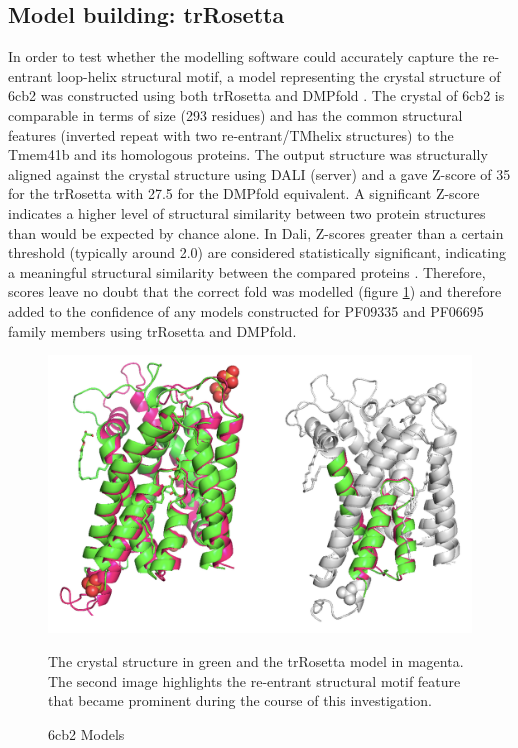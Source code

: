 \subsection{Model building: trRosetta}
In order to test whether the modelling software could accurately capture the re-entrant loop-helix structural motif, a model representing the crystal structure of 6cb2 was constructed using both trRosetta and DMPfold \cite{Greener2019}. The crystal of 6cb2 is comparable in terms of size (293 residues) and has the common structural features (inverted repeat with two re-entrant/TMhelix structures) to the Tmem41b and its homologous proteins.  The output structure was structurally aligned against the crystal structure using DALI (server) and a gave Z-score of 35 for the trRosetta with 27.5 for the DMPfold equivalent. A significant Z-score indicates a higher level of structural similarity between two protein structures than would be expected by chance alone. In Dali, Z-scores greater than a certain threshold (typically around 2.0) are considered statistically significant, indicating a meaningful structural similarity between the compared proteins \cite{Holm2016}. Therefore, scores leave no doubt that the correct fold was modelled (figure \ref{fig:6cb2_super}) and therefore added to the confidence of any models constructed for PF09335 and PF06695 family members using trRosetta and DMPfold.  


\begin{figure}[th!]
    \centering
    \includegraphics[width=\textwidth]{Results/6cb2_models.png}
    \caption{6cb2 Models}
    \label{fig:6cb2_super}
    \small
    The crystal structure in green and the trRosetta model in magenta.  The second image highlights the re-entrant structural motif feature that became prominent during the course of this investigation. 
\end{figure}


